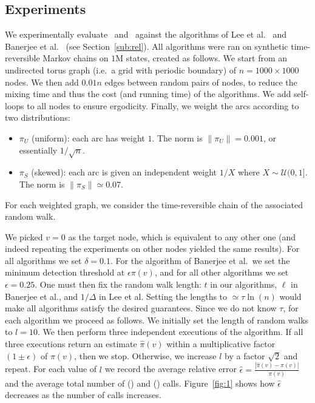 \clearpage
\subsection{Experiments}
\label{sub:exp}
We experimentally evaluate \taupiest\ and \taunest\ against the algorithms of Lee et al.~\cite{Lee&2013} and Banerjee et al.~\cite{Lofgren&2015b} (see Section~\ref{sub:rel}).
All algorithms were ran on synthetic time-reversible Markov chains on $1$M states, created as follows.
We start from an undirected torus graph (i.e.\ a grid with periodic boundary) of $n = 1000 \times 1000$ nodes.
We then add $0.01n$ edges between random pairs of nodes, to reduce the mixing time and thus the cost (and running time) of the algorithms.
We add self-loops to all nodes to ensure ergodicity.
Finally, we weight the arcs according to two distributions:
\begin{itemize}
\item $\pi_{U}$ (uniform): each arc has weight $1$.
The norm is $\|\pi_{U}\| = 0.001$, or essentially $1/\sqrt{n}$.
\item $\pi_{S}$ (skewed): each arc is given an independent weight $1/X$ where $X \sim \mathcal{U}(0,1]$.
The norm is $\|\pi_{S}\| \simeq 0.07$.
\end{itemize}
For each weighted graph, we consider the time-reversible chain of the associated random walk.

We picked $v=0$ as the target node, which is equivalent to any other one (and indeed repeating the experiments on other nodes yielded the same results).
For all algorithms we set $\delta=0.1$.
For the algorithm of Banerjee et al.\ we set the minimum detection threshold at $\epsilon \pi(v)$, and for all other algorithms we set $\epsilon=0.25$.
One must then fix the random walk length: $t$ in our algorithms, $\ell$ in Banerjee et al., and $1/\Delta$ in Lee et al.
Setting the lengths to $\simeq \tau \ln(n)$ would make all algorithms satisfy the desired guarantees.
Since we do not know $\tau$, for each algorithm we proceed as follows.
We initially set the length of random walks to $l=10$.
We then perform three independent executions of the algorithm.
If all three executions return an estimate $\hat{\pi}(v)$ within a multiplicative factor $(1 \pm \epsilon)$ of $\pi(v)$, then we stop.
Otherwise, we increase $l$ by a factor $\sqrt{2}$ and repeat.
For each value of $l$ we record the average relative error $\hat{\epsilon} = \frac{|\hat{\pi}(v) - \pi(v)|}{\pi(v)}$ and the average total number of \step() and \probe() calls.
Figure~\ref{fig:1} shows how $\hat{\epsilon}$ decreases as the number of calls increases.

